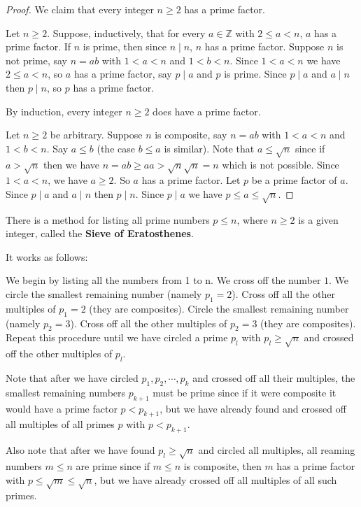 \begin{proof}
We claim that every integer $n\geq 2$ has a prime factor.

Let $n\geq 2$. Suppose, inductively, that for every $a\in\mathbb{Z}$ with $2\leq a < n$, $a$ has a prime factor. If $n$ is prime, then since $n\mid n$, $n$ has a prime factor. Suppose $n$ is not prime, say $n=ab$ with $1<a<n$ and $1<b<n$. Since $1<a<n$ we have $2\leq a <n$, so $a$ has a prime factor, say $p\mid a $ and $p$ is prime. Since $p\mid a$ and $a\mid n$ then $p\mid n$, so $p$ has a prime factor.

By induction, every integer $n\geq 2$ does have a prime factor.

Let $n\geq 2$ be arbitrary. Suppose $n$ is composite, say $n=ab$ with $1<a<n$ and $1<b<n$. Say $a\leq b$ (the case $b\leq a$ is similar). Note that $a\leq \sqrt{n}$ since if $a> \sqrt{n}$ then we have $n=ab\geq aa>\sqrt{n}\sqrt{n} = n$ which is not possible. Since $1<a<n$, we have $a\geq 2$. So $a$ has a prime factor. Let $p$ be a prime factor of $a$. Since $p\mid a$ and $a\mid n$ then $p\mid n$. Since $p\mid a$ we have $p\leq a \leq \sqrt{n}$.
\end{proof}

\begin{note}
There is a method for listing all prime numbers $p\leq n$, where $n\geq 2$ is a given integer, called the \textbf{Sieve of Eratosthenes}.

It works as follows:

We begin by listing all the numbers from 1 to n. We cross off the number $1$. We circle the smallest remaining number (namely $p_1 = 2$). Cross off all the other multiples of $p_1 = 2$ (they are composites). Circle the smallest remaining number (namely $p_2 = 3$). Cross off all the other multiples of $p_2 = 3$ (they are composites). Repeat this procedure until we have circled a prime $p_l$ with $p_l\geq \sqrt{n}$ and crossed off the other multiples of $p_l$.
\end{note}

Note that after we have circled $p_1,p_2,\cdots,p_k$ and crossed off all their multiples, the smallest remaining numbers $p_{k+1}$ must be prime since if it were composite it would have a prime factor $p<p_{k+1}$, but we have already found and crossed off all multiples of all primes $p$ with $p<p_{k+1}$.

Also note that after we have found $p_l \geq \sqrt{n}$ and circled all multiples, all reaming numbers $m\leq n$ are prime since if $m\leq n$ is composite, then $m$ has a prime factor with $p\leq\sqrt{m}\leq\sqrt{n}$, but we have already crossed off all multiples of all such primes.

